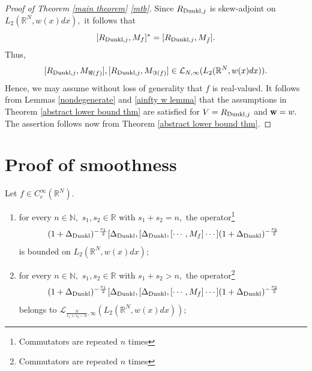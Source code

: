 \documentclass{amsart}
\begin{document}
\begin{proof}[Proof of Theorem \ref{main theorem} \eqref{mtb}] Since $R_{{\rm Dunkl},j}$ is skew-adjoint on $L_2(\mathbb{R}^N,w(x)dx),$ it follows that
$$[R_{{\rm Dunkl},j},M_f]^{\ast}=[R_{{\rm Dunkl},j},M_{\bar{f}}].$$
Thus,
$$[R_{{\rm Dunkl},j},M_{\Re(f)}],[R_{{\rm Dunkl},j},M_{\Im(f)}]\in\mathcal{L}_{N,\infty}(L_2(\mathbb{R}^N,w(x)dx)).$$
Hence, we may assume without loss of generality that $f$ is real-valued. It follows from Lemmas \ref{nondegenerate} and \ref{ainfty w lemma} that the assumptions in Theorem \ref{abstract lower bound thm} are satisfied for $V=R_{{\rm Dunkl},j}$ and ${\bf w}=w.$ The assertion follows now from Theorem \ref{abstract lower bound thm}.
\end{proof}

\section{Proof of smoothness}

\begin{theorem}\label{smoothness theorem} Let $f\in C^{\infty}_c(\mathbb{R}^N).$
\begin{enumerate}[{\rm (i)}]
\item\label{smootha} for every $n\in\mathbb{N},$ $s_1,s_2\in\mathbb{R}$ with $s_1+s_2=n,$ the operator\footnote{Commutators are repeated $n$ times}
$$(1+\Delta_{{\rm Dunkl}})^{-\frac{s_1}{2}}[\Delta_{{\rm Dunkl}},[\Delta_{{\rm Dunkl}},[\cdots,M_f]\cdots](1+\Delta_{{\rm Dunkl}})^{-\frac{s_2}{2}}$$
is bounded on $L_2(\mathbb{R}^N,w(x)dx)$;
\item\label{smoothb} for every $n\in\mathbb{N},$ $s_1,s_2\in\mathbb{R}$ with $s_1+s_2>n,$ the operator\footnote{Commutators are repeated $n$ times}
$$(1+\Delta_{{\rm Dunkl}})^{-\frac{s_1}{2}}[\Delta_{{\rm Dunkl}},[\Delta_{{\rm Dunkl}},[\cdots,M_f]\cdots](1+\Delta_{{\rm Dunkl}})^{-\frac{s_2}{2}}$$
belongs to $\mathcal{L}_{\frac{N}{s_1+s_2-n},\infty}(L_2(\mathbb{R}^N,w(x)dx));$
\end{enumerate}
\end{theorem}
\end{document}
